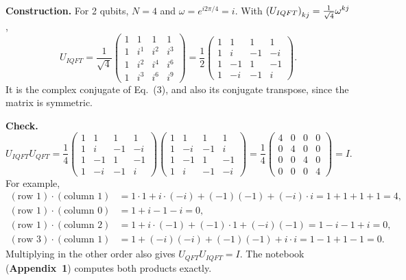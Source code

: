 \documentclass[a4paper, 10pt]{article}
\begin{document}
\begin{solution}
	\noindent \textbf{Construction.} For 2 qubits, \( N = 4 \) and \( \omega = e^{i2\pi/4} = i \). With \( \left(U_{IQFT}\right)_{kj} = \tfrac{1}{\sqrt{4}}\omega^{kj} \),
	\[
		U_{IQFT} = \frac{1}{\sqrt{4}}\begin{pmatrix}
			1 & 1   & 1   & 1   \\
			1 & i^1 & i^2 & i^3 \\
			1 & i^2 & i^4 & i^6 \\
			1 & i^3 & i^6 & i^9
		\end{pmatrix} = \frac{1}{2}\begin{pmatrix}
			1 & 1  & 1  & 1  \\
			1 & i  & -1 & -i \\
			1 & -1 & 1  & -1 \\
			1 & -i & -1 & i
		\end{pmatrix}.
	\]
	It is the complex conjugate of Eq.~(3), and also its conjugate transpose, since the matrix is symmetric.

	\myspace

	\noindent \textbf{Check.}
	\[
		U_{IQFT}U_{QFT} = \frac{1}{4}\begin{pmatrix}
			1 & 1  & 1  & 1  \\
			1 & i  & -1 & -i \\
			1 & -1 & 1  & -1 \\
			1 & -i & -1 & i
		\end{pmatrix}\begin{pmatrix}
			1 & 1  & 1  & 1  \\
			1 & -i & -1 & i  \\
			1 & -1 & 1  & -1 \\
			1 & i  & -1 & -i
		\end{pmatrix} = \frac{1}{4}\begin{pmatrix}
			4 & 0 & 0 & 0 \\
			0 & 4 & 0 & 0 \\
			0 & 0 & 4 & 0 \\
			0 & 0 & 0 & 4
		\end{pmatrix} = I.
	\]
	For example,
	\begin{align*}
		(\text{row } 1) \cdot (\text{column } 1) & = 1 \cdot 1 + i \cdot (-i) + (-1)(-1) + (-i) \cdot i = 1 + 1 + 1 + 1 = 4, \\
		(\text{row } 1) \cdot (\text{column } 0) & = 1 + i - 1 - i = 0,                                                      \\
		(\text{row } 1) \cdot (\text{column } 2) & = 1 + i \cdot (-1) + (-1) \cdot 1 + (-i)(-1) = 1 - i - 1 + i = 0,         \\
		(\text{row } 3) \cdot (\text{column } 1) & = 1 + (-i)(-i) + (-1)(-1) + i \cdot i = 1 - 1 + 1 - 1 = 0.
	\end{align*}
	Multiplying in the other order also gives \( U_{QFT}U_{IQFT} = I \). The notebook (\textbf{Appendix~1}) computes both products exactly.
\end{solution}
\end{document}
